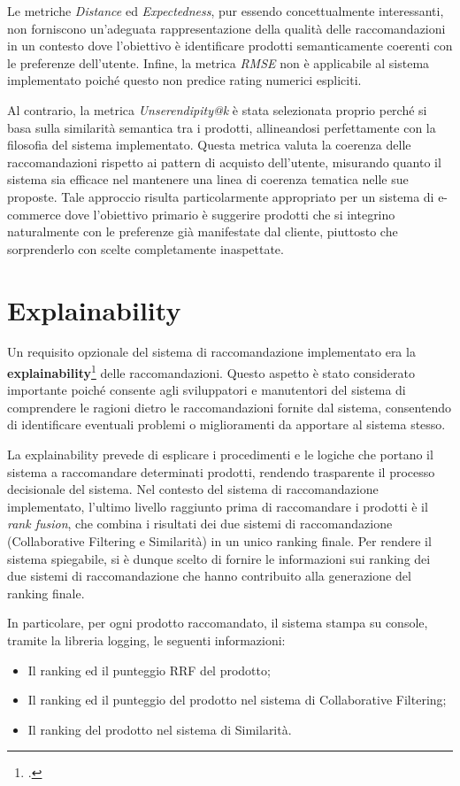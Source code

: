 Le metriche \emph{Distance} ed \emph{Expectedness}, pur essendo concettualmente interessanti, non forniscono un'adeguata rappresentazione della qualità delle raccomandazioni in un contesto dove l'obiettivo è identificare prodotti semanticamente coerenti con le preferenze dell'utente. Infine, la metrica \emph{RMSE} non è applicabile al sistema implementato poiché questo non predice rating numerici espliciti.

Al contrario, la metrica \emph{Unserendipity@k} è stata selezionata proprio perché si basa sulla similarità semantica tra i prodotti, allineandosi perfettamente con la filosofia del sistema implementato. Questa metrica valuta la coerenza delle raccomandazioni rispetto ai pattern di acquisto dell'utente, misurando quanto il sistema sia efficace nel mantenere una linea di coerenza tematica nelle sue proposte. Tale approccio risulta particolarmente appropriato per un sistema di e-commerce dove l'obiettivo primario è suggerire prodotti che si integrino naturalmente con le preferenze già manifestate dal cliente, piuttosto che sorprenderlo con scelte completamente inaspettate.


\section{Explainability}

Un requisito opzionale del sistema di raccomandazione implementato era la \textbf{\gls{explainability}}\footcite{site:explainable-ai} delle raccomandazioni. Questo aspetto è stato considerato importante poiché consente agli sviluppatori e manutentori del sistema di comprendere le ragioni dietro le raccomandazioni fornite dal sistema, consentendo di identificare eventuali problemi o miglioramenti da apportare al sistema stesso.

La explainability prevede di esplicare i procedimenti e le logiche che portano il sistema a raccomandare determinati prodotti, rendendo trasparente il processo decisionale del sistema. Nel contesto del sistema di raccomandazione implementato, l'ultimo livello raggiunto prima di raccomandare i prodotti è il \emph{rank fusion}, che combina i risultati dei due sistemi di raccomandazione (Collaborative Filtering e Similarità) in un unico ranking finale. Per rendere il sistema spiegabile, si è dunque scelto di fornire le informazioni sui ranking dei due sistemi di raccomandazione che hanno contribuito alla generazione del ranking finale.

In particolare, per ogni prodotto raccomandato, il sistema stampa su console, tramite la libreria \gls{logging}, le seguenti informazioni:
\begin{itemize}
    \item Il ranking ed il punteggio RRF del prodotto;
    \item Il ranking ed il punteggio del prodotto nel sistema di Collaborative Filtering;
    \item Il ranking del prodotto nel sistema di Similarità.
\end{itemize}

